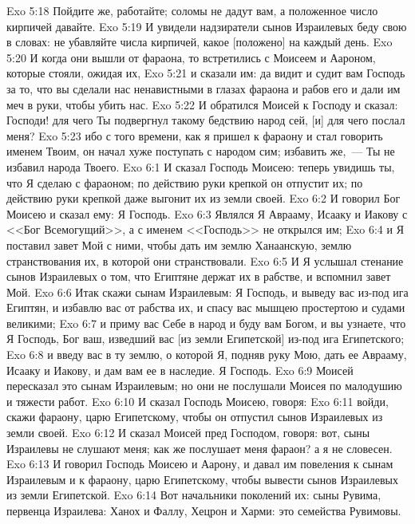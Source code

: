 \vs Exo 5:18 Пойдите же, работайте; соломы не дадут вам, а положенное число кирпичей давайте.
\vs Exo 5:19 И увидели надзиратели сынов Израилевых беду свою в словах: не убавляйте числа кирпичей, какое [положено] на каждый день.
\vs Exo 5:20 И когда они вышли от фараона, то встретились с Моисеем и Аароном, которые стояли, ожидая их,
\vs Exo 5:21 и сказали им: да видит и судит вам Господь за то, что вы сделали нас ненавистными в глазах фараона и рабов его и дали им меч в руки, чтобы убить нас.
\vs Exo 5:22 И обратился Моисей к Господу и сказал: Господи! для чего Ты подвергнул такому бедствию народ сей, [и] для чего послал меня?
\vs Exo 5:23 ибо с того времени, как я пришел к фараону и стал говорить именем Твоим, он начал хуже поступать с народом сим; избавить же,~--- Ты не избавил народа Твоего.
\vs Exo 6:1 И сказал Господь Моисею: теперь увидишь ты, что Я сделаю с фараоном; по действию руки крепкой он отпустит их; по действию руки крепкой даже выгонит их из земли своей.
\vs Exo 6:2 И говорил Бог Моисею и сказал ему: Я Господь.
\vs Exo 6:3 Являлся Я Аврааму, Исааку и Иакову с  <<Бог Всемогущий>>, а с именем  <<Господь>> не открылся им;
\vs Exo 6:4 и Я поставил завет Мой с ними, чтобы дать им землю Ханаанскую, землю странствования их, в которой они странствовали.
\vs Exo 6:5 И Я услышал стенание сынов Израилевых о том, что Египтяне держат их в рабстве, и вспомнил завет Мой.
\vs Exo 6:6 Итак скажи сынам Израилевым: Я Господь, и выведу вас из-под ига Египтян, и избавлю вас от рабства их, и спасу вас мышцею простертою и судами великими;
\vs Exo 6:7 и приму вас Себе в народ и буду вам Богом, и вы узнаете, что Я Господь, Бог ваш, изведший вас [из земли Египетской] из-под ига Египетского;
\vs Exo 6:8 и введу вас в ту землю, о которой Я, подняв руку Мою,  дать ее Аврааму, Исааку и Иакову, и дам вам ее в наследие. Я Господь.
\vs Exo 6:9 Моисей пересказал это сынам Израилевым; но они не послушали Моисея по малодушию и тяжести работ.
\vs Exo 6:10 И сказал Господь Моисею, говоря:
\vs Exo 6:11 войди, скажи фараону, царю Египетскому, чтобы он отпустил сынов Израилевых из земли своей.
\vs Exo 6:12 И сказал Моисей пред Господом, говоря: вот, сыны Израилевы не слушают меня; как же послушает меня фараон? а я не словесен.
\vs Exo 6:13 И говорил Господь Моисею и Аарону, и давал им повеления к сынам Израилевым и к фараону, царю Египетскому, чтобы вывести сынов Израилевых из земли Египетской.
\rsbpar\vs Exo 6:14 Вот начальники поколений их: сыны Рувима, первенца Израилева: Ханох и Фаллу, Хецрон и Харми: это семейства Рувимовы.
